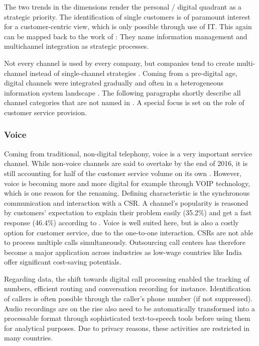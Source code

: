 		The two trends in the dimensions render the personal / digital quadrant as a strategic priority.
		The identification of single customers is of paramount interest for a customer-centric view, which is only possible through use of \acrshort{IT}.  
		This again can be mapped back to the work of \cite{paynefrow2005}: They name information management and multichannel integration as strategic processes. 
		
		Not every channel is used by every company, but companies tend to create multi-channel instead of single-channel strategies \citep{Frow_2007}. Coming from a pre-digital age, digital channels were integrated gradually and often in a heterogeneous information system landscape \citep{Chen_2003}. The following paragraphs shortly describe all channel categories that are not named  in  \cite{paynefrow2005}. A special focus is set on the role of customer service provision. 
		
		
		\subsubsection{Voice}
		
		Coming from traditional, non-digital telephony, voice is a very important service channel. While non-voice channels are said to overtake by the end of 2016, it is still accounting for half of the customer service volume on its own \citep{dimensiondata2016}. However, voice is becoming more and more digital for example through \acrfull{VOIP} technology, which is one reason for the renaming. Defining characteristic is the synchronous communication and interaction with a \acrfull{CSR}. A channel's popularity is reasoned by customers' expectation to explain their problem easily (35.2\%) and get a fast response (46.4\%) according to \cite{Agnischock2015}. Voice is well suited here, but is also a costly option for customer service, due to the one-to-one interaction. \acrshort{CSR}s are not able to process multiple calls simultaneously. Outsourcing call centers has therefore become a major application across industries as low-wage countries like India offer significant cost-saving potentials.  
		
		Regarding data, the shift towards digital call processing enabled the tracking of numbers, efficient routing and conversation recording for instance. Identification of callers is often possible through the caller's phone number (if not suppressed). %
		Audio recordings are on the rise \citep{ccnet2016} also need to be automatically transformed into a processable format through sophisticated text-to-speech tools before using them for analytical purposes. Due to privacy reasons, these activities are restricted in many countries. 
		
